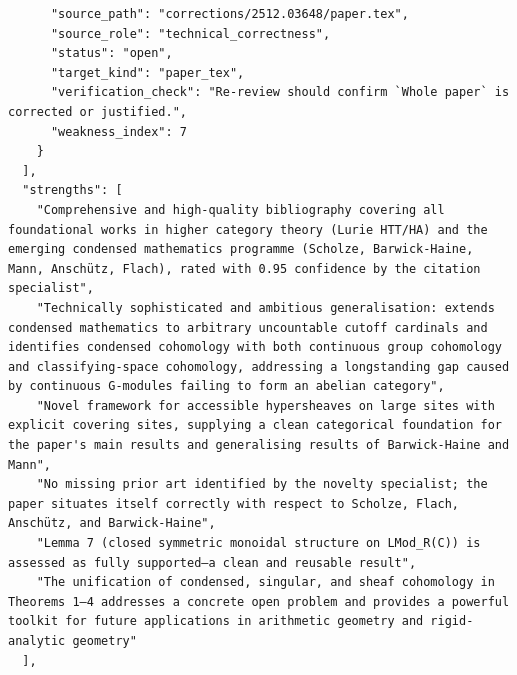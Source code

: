 \documentclass[11pt]{article}
\begin{document}
\begin{verbatim}
      "source_path": "corrections/2512.03648/paper.tex",
      "source_role": "technical_correctness",
      "status": "open",
      "target_kind": "paper_tex",
      "verification_check": "Re-review should confirm `Whole paper` is corrected or justified.",
      "weakness_index": 7
    }
  ],
  "strengths": [
    "Comprehensive and high-quality bibliography covering all foundational works in higher category theory (Lurie HTT/HA) and the emerging condensed mathematics programme (Scholze, Barwick-Haine, Mann, Anschütz, Flach), rated with 0.95 confidence by the citation specialist",
    "Technically sophisticated and ambitious generalisation: extends condensed mathematics to arbitrary uncountable cutoff cardinals and identifies condensed cohomology with both continuous group cohomology and classifying-space cohomology, addressing a longstanding gap caused by continuous G-modules failing to form an abelian category",
    "Novel framework for accessible hypersheaves on large sites with explicit covering sites, supplying a clean categorical foundation for the paper's main results and generalising results of Barwick-Haine and Mann",
    "No missing prior art identified by the novelty specialist; the paper situates itself correctly with respect to Scholze, Flach, Anschütz, and Barwick-Haine",
    "Lemma 7 (closed symmetric monoidal structure on LMod_R(C)) is assessed as fully supported—a clean and reusable result",
    "The unification of condensed, singular, and sheaf cohomology in Theorems 1–4 addresses a concrete open problem and provides a powerful toolkit for future applications in arithmetic geometry and rigid-analytic geometry"
  ],

\end{verbatim}
\end{document}
